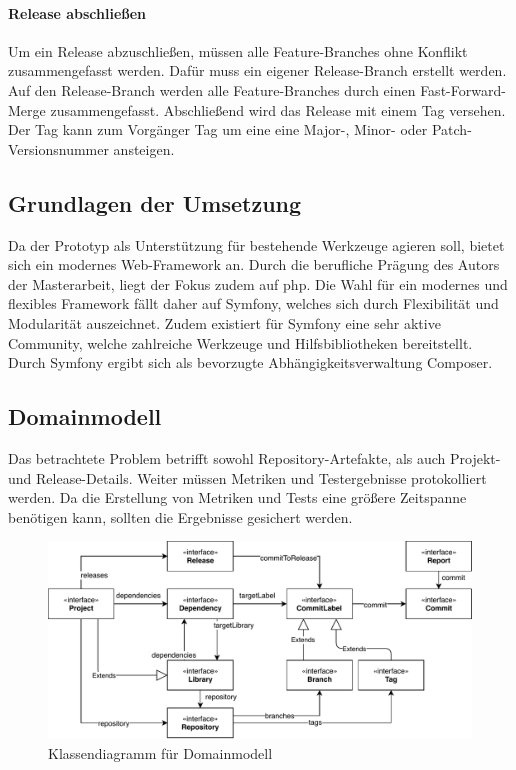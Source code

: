 \paragraph{Release abschließen}
Um ein Release abzuschließen, müssen alle Feature-Branches ohne Konflikt zusammengefasst werden. Dafür muss ein eigener Release-Branch erstellt werden. Auf den Release-Branch werden alle Feature-Branches durch einen Fast-Forward-Merge zusammengefasst. Abschließend wird das Release mit einem Tag versehen. Der Tag kann zum Vorgänger Tag um eine eine Major\hyp{}, Minor\hyp{} oder Patch\hyp{}Versionsnummer ansteigen.

\subsection{Grundlagen der Umsetzung}

Da der Prototyp als Unterstützung für bestehende Werkzeuge agieren soll, bietet sich ein modernes Web-Framework an. Durch die berufliche Prägung des Autors der Masterarbeit, liegt der Fokus zudem auf \acs{php}. Die Wahl für ein modernes und flexibles Framework fällt daher auf Symfony, welches sich durch Flexibilität und Modularität auszeichnet. Zudem existiert für Symfony eine sehr aktive Community, welche zahlreiche Werkzeuge und Hilfsbibliotheken bereitstellt. Durch Symfony ergibt sich als bevorzugte Abhängigkeitsverwaltung Composer.  

\subsection{Domainmodell}

Das betrachtete Problem betrifft sowohl Repository-Artefakte, als auch Projekt- und Release-Details. Weiter müssen Metriken und Testergebnisse protokolliert werden. Da die Erstellung von Metriken und Tests eine größere Zeitspanne benötigen kann, sollten die Ergebnisse gesichert werden. 

\begin{figure}[htbp]
  \includegraphics[width=\textwidth, height=\textheight, keepaspectratio]
  {resources/ReleaseWardenClassChart.pdf}
  \caption{Klassendiagramm für Domainmodell}
  \label{class-chart-release-warden}
\end{figure}

